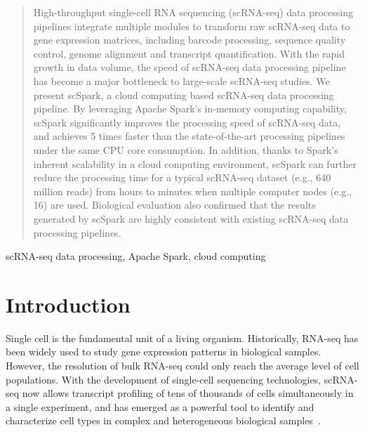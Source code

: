 \documentclass[conference]{IEEEtran}
\begin{document}
\begin{abstract}
High-throughput single-cell RNA sequencing (scRNA-seq) data processing pipelines integrate multiple modules to transform raw scRNA-seq data to gene expression matrices, including barcode processing, sequence quality control, genome alignment and transcript quantification.
With the rapid growth in data volume, the speed of scRNA-seq data processing pipeline has become a major bottleneck to large-scale scRNA-seq studies. 
We present scSpark, a cloud computing based scRNA-seq data processing pipeline. 
By leveraging Apache Spark's in-memory computing capability, scSpark significantly improves the processing speed of scRNA-seq data, and achieves 5 times faster than the state-of-the-art processing pipelines under the same CPU core consumption.
In addition, thanks to Spark's inherent scalability in a cloud computing environment, scSpark can further reduce the processing time for a typical scRNA-seq dataset (e.g., 640 million reads) from hours to minutes when multiple computer nodes (e.g., 16) are used.  
Biological evaluation also confirmed that the results generated by scSpark are highly consistent with existing scRNA-seq data processing pipelines.
\end{abstract}

\begin{IEEEkeywords}
scRNA-seq data processing, Apache Spark, cloud computing
\end{IEEEkeywords}

\section{Introduction}
Single cell is the fundamental unit of a living organism.
Historically, RNA-seq has been widely used to study gene expression patterns in biological samples.
However, the resolution of bulk RNA-seq could only reach the average level of cell populations. 
With the development of single-cell sequencing technologies, scRNA-seq now allows transcript profiling of tens of thousands of cells simultaneously in a single experiment, and has emerged as a powerful tool to identify and characterize cell types in complex and heterogeneous biological samples~\cite{Zhang2019ComparativeAO}.
\end{document}

